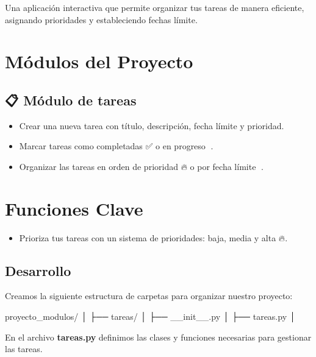 \documentclass[
  a4paper,
  DIV=11,
  numbers=noendperiod,
  onepage,
  openany]{scrreprt}
\newenvironment{Shaded}{\begin{snugshade}}{\end{snugshade}}
\newcommand{\NormalTok}[1]{\textcolor[rgb]{0.00,0.23,0.31}{#1}}
\providecommand{\tightlist}{%
  \setlength{\itemsep}{0pt}\setlength{\parskip}{0pt}}\usepackage{longtable,booktabs,array}
\begin{document}
Una aplicación interactiva que permite organizar tus tareas de manera
eficiente, asignando prioridades y estableciendo fechas límite.

\section{Módulos del Proyecto}\label{muxf3dulos-del-proyecto}

\subsection{📋 Módulo de tareas}\label{muxf3dulo-de-tareas}

\begin{itemize}
\item
  Crear una nueva tarea con título, descripción, fecha límite y
  prioridad.
\item
  Marcar tareas como completadas ✅ o en progreso 🔄.
\item
  Organizar las tareas en orden de prioridad 🔥 o por fecha límite 📅.
\end{itemize}

\section{Funciones Clave}\label{funciones-clave}

\begin{itemize}
\tightlist
\item
  Prioriza tus tareas con un sistema de prioridades: baja, media y alta
  🔥.
\end{itemize}

\subsection{Desarrollo}\label{desarrollo}

Creamos la siguiente estructura de carpetas para organizar nuestro
proyecto:

\begin{Shaded}
\begin{Highlighting}[]
\NormalTok{proyecto\_modulos/}
\NormalTok{│}
\NormalTok{├── tareas/}
\NormalTok{│   ├── \_\_init\_\_.py}
\NormalTok{│   ├── tareas.py}
\NormalTok{│}
\end{Highlighting}
\end{Shaded}

En el archivo \textbf{tareas.py} definimos las clases y funciones
necesarias para gestionar las tareas.
\end{document}
